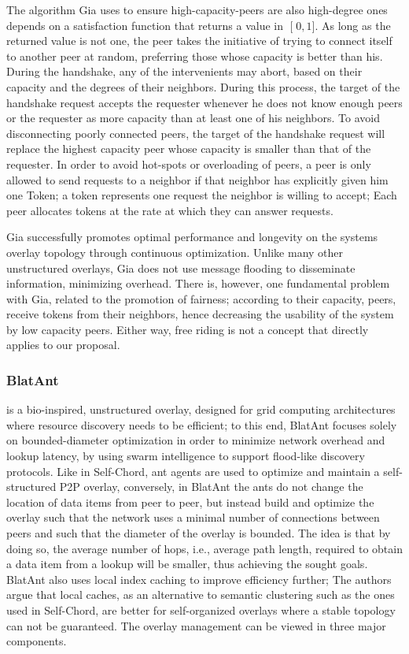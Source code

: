 \documentclass[runningheads]{llncs}
\begin{document}
The algorithm Gia uses to ensure high-capacity-peers are also high-degree ones depends on a satisfaction function that returns a value in $\mathclose[0,1\mathclose]$. As long as the returned value is not one, the peer takes the initiative of trying to connect itself to another peer at random, preferring those whose capacity is better than his. During the handshake, any of the intervenients may abort, based on their capacity and the degrees of their neighbors. During this process, the target of the handshake request accepts the requester whenever he does not know enough peers or the requester as more capacity than at least one of his neighbors. To avoid disconnecting poorly connected peers, the target of the handshake request will replace the highest capacity peer whose capacity is smaller than that of the requester. In order to avoid hot-spots or overloading of peers, a peer is only allowed to send requests to a neighbor if that neighbor has explicitly given him one Token; a token represents one request the neighbor is willing to accept; Each peer allocates tokens at the rate at which they can answer requests.

Gia successfully promotes optimal performance and longevity on the systems overlay topology through continuous optimization. Unlike many other unstructured overlays, Gia does not use message flooding to disseminate information, minimizing overhead. There is, however, one fundamental problem with Gia, related to the promotion of fairness; according to their capacity, peers, receive tokens from their neighbors, hence decreasing the usability of the system by low capacity peers. Either way, free riding is not a concept that directly applies to our proposal.\newline

\subsubsection{BlatAnt} \cite{blatant} is a bio-inspired, unstructured overlay, designed for grid computing architectures where resource discovery needs to be efficient; to this end, BlatAnt focuses solely on bounded-diameter optimization in order to minimize network overhead and lookup latency, by using swarm intelligence to support flood-like discovery protocols. Like in Self-Chord, ant agents are used to optimize and maintain a self-structured P2P overlay, conversely, in BlatAnt the ants do not change the location of data items from peer to peer, but instead build and optimize the overlay such that the network uses a minimal number of connections between peers and such that the diameter of the overlay is bounded. The idea is that by doing so, the average number of hops, i.e., average path length, required to obtain a data item from a lookup will be smaller, thus achieving the sought goals. BlatAnt also uses local index caching to improve efficiency further; The authors argue that local caches,  as an alternative to semantic clustering such as the ones used in Self-Chord, are better for self-organized overlays where a stable topology can not be guaranteed. The overlay management can be viewed in three major components.
\end{document}
